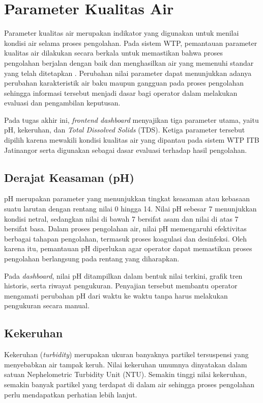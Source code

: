\section{Parameter Kualitas Air}

Parameter kualitas air merupakan indikator yang digunakan untuk menilai kondisi
air selama proses pengolahan. Pada sistem WTP, pemantauan parameter kualitas air
dilakukan secara berkala untuk memastikan bahwa proses pengolahan berjalan
dengan baik dan menghasilkan air yang memenuhi standar yang telah ditetapkan
\autocite{kementerian2023permenkes}. Perubahan nilai parameter dapat menunjukkan adanya perubahan karakteristik air
baku maupun gangguan pada proses pengolahan sehingga informasi tersebut menjadi
dasar bagi operator dalam melakukan evaluasi dan pengambilan keputusan.

Pada tugas akhir ini, \textit{frontend dashboard} menyajikan tiga parameter utama, yaitu
pH, kekeruhan, dan \textit{Total Dissolved Solids} (TDS). Ketiga parameter
tersebut dipilih karena mewakili kondisi kualitas air yang dipantau pada sistem
WTP ITB Jatinangor serta digunakan sebagai dasar evaluasi terhadap hasil
pengolahan.

\subsection{Derajat Keasaman (pH)}

pH merupakan parameter yang menunjukkan tingkat keasaman atau kebasaan suatu
larutan dengan rentang nilai 0 hingga 14. Nilai pH sebesar 7 menunjukkan kondisi
netral, sedangkan nilai di bawah 7 bersifat asam dan nilai di atas 7 bersifat
basa. Dalam proses pengolahan air, nilai pH memengaruhi efektivitas berbagai
tahapan pengolahan, termasuk proses koagulasi dan desinfeksi. Oleh karena itu,
pemantauan pH diperlukan agar operator dapat memastikan proses pengolahan
berlangsung pada rentang yang diharapkan.

Pada \textit{dashboard}, nilai pH ditampilkan dalam bentuk nilai terkini,
grafik tren historis, serta riwayat pengukuran. Penyajian tersebut membantu
operator mengamati perubahan pH dari waktu ke waktu tanpa harus melakukan
pengukuran secara manual.

\subsection{Kekeruhan}

Kekeruhan (\textit{turbidity}) merupakan ukuran banyaknya partikel tersuspensi
yang menyebabkan air tampak keruh. Nilai kekeruhan umumnya dinyatakan dalam
satuan Nephelometric Turbidity Unit (NTU). Semakin tinggi nilai kekeruhan,
semakin banyak partikel yang terdapat di dalam air sehingga proses pengolahan
perlu mendapatkan perhatian lebih lanjut.

